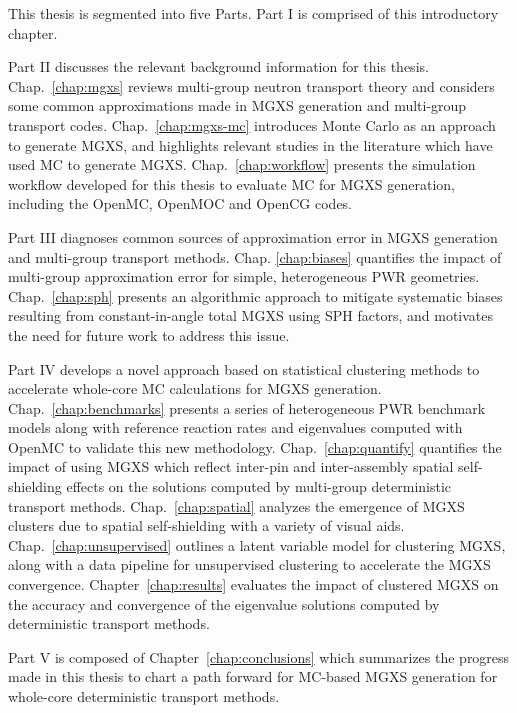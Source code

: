 This thesis is segmented into five Parts. Part I is comprised of this introductory chapter.

Part II discusses the relevant background information for this thesis. Chap.~\ref{chap:mgxs} reviews multi-group neutron transport theory and considers some common approximations made in \ac{MGXS} generation and multi-group transport codes. Chap.~\ref{chap:mgxs-mc} introduces Monte Carlo as an approach to generate \ac{MGXS}, and highlights relevant studies in the literature which have used \ac{MC} to generate \ac{MGXS}. Chap.~\ref{chap:workflow} presents the simulation workflow developed for this thesis to evaluate \ac{MC} for \ac{MGXS} generation, including the OpenMC, OpenMOC and OpenCG codes.

Part III diagnoses common sources of approximation error in \ac{MGXS} generation and multi-group transport methods. Chap. \ref{chap:biases} quantifies the impact of multi-group approximation error for simple, heterogeneous \ac{PWR} geometries. Chap.~\ref{chap:sph} presents an algorithmic approach to mitigate systematic biases resulting from constant-in-angle total \ac{MGXS} using \ac{SPH} factors, and motivates the need for future work to address this issue.

Part IV develops a novel approach based on statistical clustering methods to accelerate whole-core \ac{MC} calculations for \ac{MGXS} generation. Chap.~\ref{chap:benchmarks} presents a series of heterogeneous \ac{PWR} benchmark models along with reference reaction rates and eigenvalues computed with OpenMC to validate this new methodology. Chap.~\ref{chap:quantify} quantifies the impact of using \ac{MGXS} which reflect inter-pin and inter-assembly spatial self-shielding effects on the solutions computed by multi-group deterministic transport methods. Chap.~\ref{chap:spatial} analyzes the emergence of \ac{MGXS} clusters due to spatial self-shielding with a variety of visual aids. Chap.~\ref{chap:unsupervised} outlines a latent variable model for clustering \ac{MGXS}, along with a data pipeline for unsupervised clustering to accelerate the \ac{MGXS} convergence. Chapter~\ref{chap:results} evaluates the impact of clustered \ac{MGXS} on the accuracy and convergence of the eigenvalue solutions computed by deterministic transport methods.

Part V is composed of Chapter~\ref{chap:conclusions} which summarizes the progress made in this thesis to chart a path forward for \ac{MC}-based \ac{MGXS} generation for whole-core deterministic transport methods.


